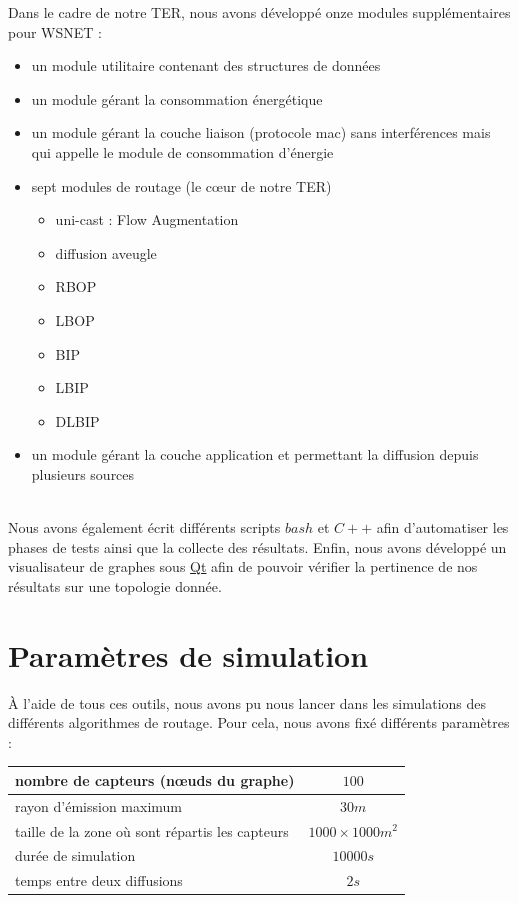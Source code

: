 Dans le cadre de notre TER, nous avons développé onze modules supplémentaires pour WSNET : 
\begin{itemize}
	\item un module utilitaire contenant des structures de données
	\item un module gérant la consommation énergétique
	\item un module gérant la couche liaison (protocole mac) sans interférences mais qui appelle le module de consommation d'énergie
	\item sept modules de routage (le cœur de notre TER)
		\begin{itemize}
			\item uni-cast : Flow Augmentation \cite{Chang2000}
			\item diffusion aveugle
			\item RBOP \cite{Cartigny2005}
			\item LBOP \cite{Cartigny2005}
			\item BIP \cite{Wieselthier2000}
			\item LBIP \cite{Ingelrest2008}
			\item DLBIP \cite{Champ2009DLBIP}
		\end{itemize}
	\item un module gérant la couche application et permettant la diffusion depuis plusieurs sources
\end{itemize}
~\\
Nous avons également écrit différents scripts $bash$ et $C++$ afin d'automatiser les phases de tests ainsi que la collecte des résultats. Enfin, nous avons développé un visualisateur de graphes sous \href{http://qt.nokia.com/}{Qt} afin de pouvoir vérifier la pertinence de nos résultats sur une topologie donnée.


\section{Paramètres de simulation}

À l'aide de tous ces outils, nous avons pu nous lancer dans les simulations des différents algorithmes de routage. Pour cela, nous avons fixé différents paramètres :

\renewcommand\arraystretch{1.6}
\begin{tabular}{| l | c |}
\hline
nombre de capteurs (nœuds du graphe) & $100$ \\ \hline
rayon d'émission maximum & $30m$ \\ \hline
taille de la zone où sont répartis les capteurs & $1000 \times 1000 m^2$ \\ \hline
durée de simulation & $10000s$ \\ \hline
temps entre deux diffusions & $2s$ \\ \hline
\end{tabular}

